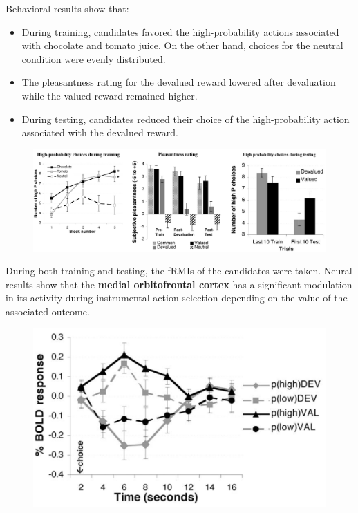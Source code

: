 \begin{casestudy}
    Behavioral results show that:
    \begin{itemize}
        \item During training, candidates favored the high-probability actions associated with chocolate and tomato juice.
            On the other hand, choices for the neutral condition were evenly distributed.
        \item The pleasantness rating for the devalued reward lowered after devaluation while the valued reward remained higher.
        \item During testing, candidates reduced their choice of the high-probability action associated with the devalued reward.
    \end{itemize}
    \begin{figure}[H]
        \centering
        \includegraphics[width=0.9\linewidth]{./img/human_goal_directed_experiment3.png}
    \end{figure}

    During both training and testing, the fRMIs of the candidates were taken.
    Neural results show that the \textbf{medial orbitofrontal cortex }has a significant modulation in its activity during instrumental action selection
    depending on the value of the associated outcome.
    \begin{figure}[H]
        \centering
        \includegraphics[width=0.4\linewidth]{./img/human_goal_directed_experiment4.png}
    \end{figure}
\end{casestudy}

